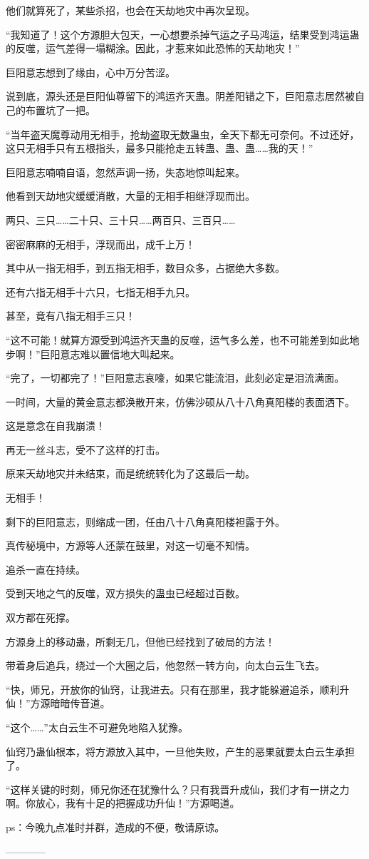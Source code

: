 \begin{this_body}
他们就算死了，某些杀招，也会在天劫地灾中再次呈现。

“我知道了！这个方源胆大包天，一心想要杀掉气运之子马鸿运，结果受到鸿运蛊的反噬，运气差得一塌糊涂。因此，才惹来如此恐怖的天劫地灾！”

巨阳意志想到了缘由，心中万分苦涩。

说到底，源头还是巨阳仙尊留下的鸿运齐天蛊。阴差阳错之下，巨阳意志居然被自己的布置坑了一把。

“当年盗天魔尊动用无相手，抢劫盗取无数蛊虫，全天下都无可奈何。不过还好，这只无相手只有五根指头，最多只能抢走五转蛊、蛊、蛊……我的天！”

巨阳意志喃喃自语，忽然声调一扬，失态地惊叫起来。

他看到天劫地灾缓缓消散，大量的无相手相继浮现而出。

两只、三只……二十只、三十只……两百只、三百只……

密密麻麻的无相手，浮现而出，成千上万！

其中从一指无相手，到五指无相手，数目众多，占据绝大多数。

还有六指无相手十六只，七指无相手九只。

甚至，竟有八指无相手三只！

“这不可能！就算方源受到鸿运齐天蛊的反噬，运气多么差，也不可能差到如此地步啊！”巨阳意志难以置信地大叫起来。

“完了，一切都完了！”巨阳意志哀嚎，如果它能流泪，此刻必定是泪流满面。

一时间，大量的黄金意志都涣散开来，仿佛沙硕从八十八角真阳楼的表面洒下。

这是意念在自我崩溃！

再无一丝斗志，受不了这样的打击。

原来天劫地灾并未结束，而是统统转化为了这最后一劫。

无相手！

剩下的巨阳意志，则缩成一团，任由八十八角真阳楼袒露于外。

真传秘境中，方源等人还蒙在鼓里，对这一切毫不知情。

追杀一直在持续。

受到天地之气的反噬，双方损失的蛊虫已经超过百数。

双方都在死撑。

方源身上的移动蛊，所剩无几，但他已经找到了破局的方法！

带着身后追兵，绕过一个大圈之后，他忽然一转方向，向太白云生飞去。

“快，师兄，开放你的仙窍，让我进去。只有在那里，我才能躲避追杀，顺利升仙！”方源暗暗传音道。

“这个……”太白云生不可避免地陷入犹豫。

仙窍乃蛊仙根本，将方源放入其中，一旦他失败，产生的恶果就要太白云生承担了。

“这样关键的时刻，师兄你还在犹豫什么？只有我晋升成仙，我们才有一拼之力啊。你放心，我有十足的把握成功升仙！”方源喝道。

ps：今晚九点准时并群，造成的不便，敬请原谅。

------------

\end{this_body}

